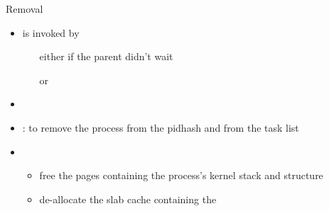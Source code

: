 \begin{frame}
  \begin{block}{Removal}
    \begin{itemize}
    \item {} is invoked by
      \begin{itemize}
      \item[either]  if the parent didn't wait
      \item[or] 
      \end{itemize}
    \item {}
    \item {}: to remove the process from the pidhash and from the task
      list
    \item {}
      \begin{itemize}
      \item free the pages containing the process's kernel stack and 
        structure
      \item de-allocate the slab cache containing the 
      \end{itemize}
    \end{itemize}
  \end{block}
\end{frame}



